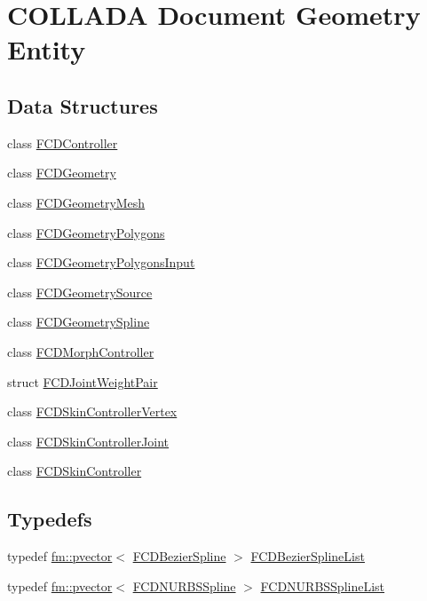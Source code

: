 \hypertarget{group__FCDGeometry}{
\section{COLLADA Document Geometry Entity}
\label{group__FCDGeometry}
}
\subsection*{Data Structures}
\begin{DoxyCompactItemize}
\item 
class \hyperlink{classFCDController}{FCDController}
\item 
class \hyperlink{classFCDGeometry}{FCDGeometry}
\item 
class \hyperlink{classFCDGeometryMesh}{FCDGeometryMesh}
\item 
class \hyperlink{classFCDGeometryPolygons}{FCDGeometryPolygons}
\item 
class \hyperlink{classFCDGeometryPolygonsInput}{FCDGeometryPolygonsInput}
\item 
class \hyperlink{classFCDGeometrySource}{FCDGeometrySource}
\item 
class \hyperlink{classFCDGeometrySpline}{FCDGeometrySpline}
\item 
class \hyperlink{classFCDMorphController}{FCDMorphController}
\item 
struct \hyperlink{structFCDJointWeightPair}{FCDJointWeightPair}
\item 
class \hyperlink{classFCDSkinControllerVertex}{FCDSkinControllerVertex}
\item 
class \hyperlink{classFCDSkinControllerJoint}{FCDSkinControllerJoint}
\item 
class \hyperlink{classFCDSkinController}{FCDSkinController}
\end{DoxyCompactItemize}
\subsection*{Typedefs}
\begin{DoxyCompactItemize}
\item 
typedef \hyperlink{classfm_1_1pvector}{fm::pvector}$<$ \hyperlink{classFCDBezierSpline}{FCDBezierSpline} $>$ \hyperlink{group__FCDGeometry_ga682b3a25e3a6897d53ed4ecfca38cc02}{FCDBezierSplineList}
\item 
typedef \hyperlink{classfm_1_1pvector}{fm::pvector}$<$ \hyperlink{classFCDNURBSSpline}{FCDNURBSSpline} $>$ \hyperlink{group__FCDGeometry_ga3a3cbf3258acc2e38013b0393f0fedc8}{FCDNURBSSplineList}
\end{DoxyCompactItemize}


